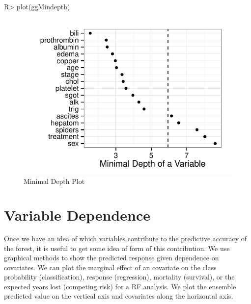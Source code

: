 \documentclass[nojss]{jss}\usepackage[]{graphicx}\usepackage[]{color}
\makeatletter
\def\maxwidth{ %
  \ifdim\Gin@nat@width>\linewidth
    \linewidth
  \else
    \Gin@nat@width
  \fi
}
\makeatother
\begin{document}
\begin{Schunk}
\begin{Sinput}
R> plot(ggMindepth)
\end{Sinput}
\begin{figure}[!htpb]

{\centering \includegraphics[width=\maxwidth]{figure/rfs-mindepth-plot-1} 

}

\caption[Minimal Depth Plot]{Minimal Depth Plot\label{fig:mindepth-plot}}
\end{figure}
\end{Schunk}


\section{Variable Dependence}\label{S:dependence}
Once we have an idea of which variables contribute to the predictive accuracy of the forest, it is useful to get some idea of form of this contribution. We use graphical methods to show the predicted response given dependence on covariates. We can plot the marginal effect of an covariate on the class probability (classification), response (regression), mortality (survival), or the expected years lost (competing risk) for a RF analysis. We plot the ensemble predicted value on the vertical axis and covariates along the horizontal axis.
\end{document}
